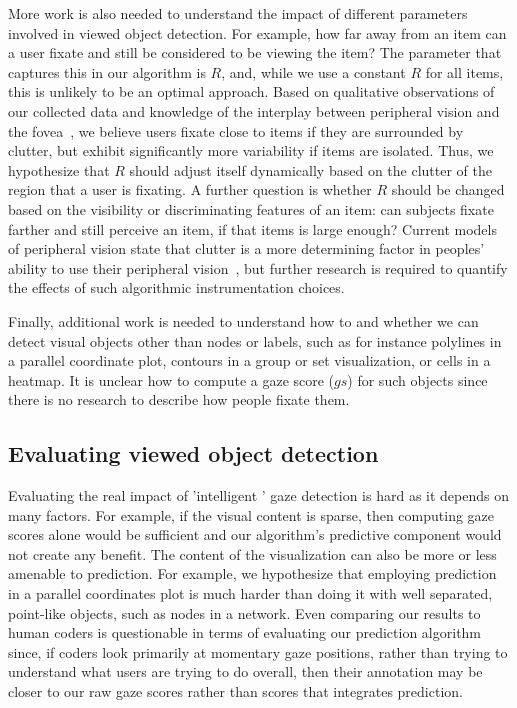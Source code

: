 More work is also needed to understand the impact of different parameters involved in viewed object detection. For example, how far away from an item can a user fixate and still be considered to be viewing the item? The parameter that captures this in our algorithm is $R$, and, while we use a constant $R$ for all items, this is unlikely to be an optimal approach. Based on qualitative observations of our collected data and knowledge of the interplay between peripheral vision and the fovea~\cite{balas2009summary}, we believe users fixate close to items if they are surrounded by clutter,  but exhibit significantly more variability if items are isolated. Thus, we hypothesize that $R$ should adjust itself dynamically based on the clutter of the region that a user is fixating.  A further question is whether $R$ should be changed based on the visibility or discriminating features of an item: can subjects fixate farther and still perceive an item, if that items is large enough? Current models of peripheral vision state that clutter is a more determining factor in peoples’ ability to use their peripheral vision~\cite{balas2009summary}, but further research is required to quantify the effects of such algorithmic instrumentation choices. 




Finally, additional work is needed to understand how to and whether we can detect visual objects other than nodes or labels, such as for instance polylines in a parallel coordinate plot, contours in a group or set visualization, or cells in a heatmap. It is unclear how to compute a gaze score ($gs$) for such objects since there is no research to describe how people fixate them. 

\subsection{Evaluating viewed object detection} 

Evaluating the real impact of 'intelligent ' gaze detection is hard as it depends on many factors. For example, if the visual content is sparse, then computing gaze scores alone would be sufficient and our algorithm's predictive component would not create any benefit. The content of the visualization can also be more or less amenable to prediction. For example, we hypothesize that employing prediction in a parallel coordinates plot is much harder than doing it with well separated, point-like objects, such as nodes in a network. Even comparing our results to human coders is questionable in terms of evaluating our prediction algorithm since, if coders look primarily at momentary gaze positions, rather than trying to understand what users are trying to do overall, then their annotation may be closer to our raw gaze scores rather than scores that integrates prediction. 


